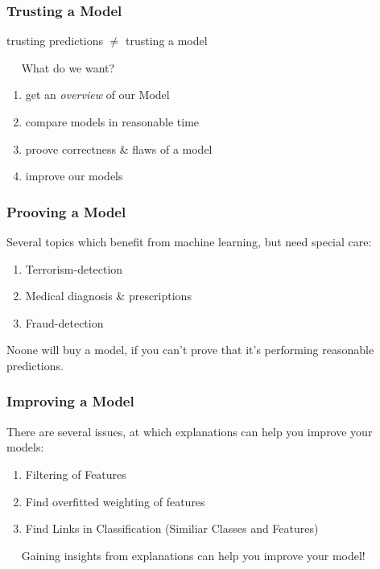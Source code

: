 \begin{frame}
	\frametitle{Trusting a Model}
	\begin{center}
		\begin{Large}
			trusting predictions $\neq$ trusting a model
		\end{Large}
	\end{center}
~\newline ~\newline 
	What do we want? 
	\begin{enumerate}
		\item get an \textit{overview} of our Model
		\item compare models in reasonable time
		\item proove correctness \& flaws of a model
		\item improve our models
	\end{enumerate}
\end{frame}

\begin{frame}
	\frametitle{Prooving a Model}
	Several topics which benefit from machine learning, but need special care: 
	\begin{Large}
		\begin{enumerate}
			\item Terrorism-detection
			\item Medical diagnosis \& prescriptions
			\item Fraud-detection
		\end{enumerate}
	\end{Large}

	Noone will buy a model, if you can't prove that it's performing reasonable predictions.
\end{frame}
\begin{frame}
	\frametitle{Improving a Model}
	There are several issues, at which explanations can help you improve your models:
	~\newline
	\begin{Large}
		\begin{enumerate}
			\item Filtering of Features
			\item Find overfitted weighting of features
			\item Find Links in Classification (Similiar Classes and Features)
		\end{enumerate}
	\end{Large}
	~\newline ~\newline
	Gaining insights from explanations can help you improve your model!
\end{frame}